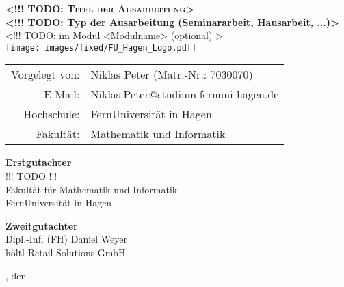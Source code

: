 
\thispagestyle{plain}
\begin{titlepage}

\begin{center}

\huge{\textbf{\textsc{<!!! TODO: Titel der Ausarbeitung>}}}\\[1.5ex]

\LARGE{\textbf{<!!! TODO: Typ der Ausarbeitung (Seminararbeit, Hausarbeit, ...)>}}\\[1.5ex]
\Large{<!!! TODO: im Modul <Modulname> (optional) >}\\[6ex]
\vfill
\texttt{[image: images/fixed/FU\_Hagen\_Logo.pdf]}\\[3ex]

\normalsize
 \vfill
\begin{tabular}{rl}
 Vorgelegt von: &  Niklas Peter (Matr.-Nr.: 7030070) \\[0ex]
 E-Mail: & Niklas.Peter@studium.fernuni-hagen.de \\
 Hochschule: & FernUniversität in Hagen \\[0ex]
 Fakultät: & Mathematik und Informatik \\[0ex]
\end{tabular}


\vfill
\vspace{1cm}

\begin{minipage}[t]{.5\linewidth}
\textbf{Erstgutachter} \\
!!! TODO !!! \\
Fakultät für Mathematik und Informatik \\
FernUniversität in Hagen\\
\end{minipage}
\begin{minipage}[t]{.45\linewidth}
\textbf{Zweitgutachter} \\
Dipl.-Inf. (FH) Daniel Weyer \\
höltl Retail Solutions GmbH \\
\end{minipage}
\end{center}		

\singlespacing
\small
\begin{center}
\npHandoverLocation, den \npHandoverDate
\end{center}

\end{titlepage}


